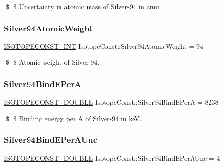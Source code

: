 \$ \$ Uncertainty in atomic mass of Silver-\/94 in amu. \mbox{\label{group___isotope_const-_silver-_ag94_ga02ad799dcf0aab3e61dc5f3f7c143081}} 
\subsubsection{\texorpdfstring{Silver94\+Atomic\+Weight}{Silver94AtomicWeight}}
{\footnotesize\ttfamily \mbox{\hyperlink{group___isotope_const-_macros_ga5f18360b3e99483a35c32d789e62621c}{I\+S\+O\+T\+O\+P\+E\+C\+O\+N\+S\+T\+\_\+\+I\+NT}} Isotope\+Const\+::\+Silver94\+Atomic\+Weight = 94}

\$ \$ Atomic weight of Silver-\/94. \mbox{\label{group___isotope_const-_silver-_ag94_ga5819df665cf02498444ad6043a2589b2}} 
\subsubsection{\texorpdfstring{Silver94\+Bind\+E\+PerA}{Silver94BindEPerA}}
{\footnotesize\ttfamily \mbox{\hyperlink{group___isotope_const-_macros_ga8f45a7272ce02c0b4c65c44636ed719a}{I\+S\+O\+T\+O\+P\+E\+C\+O\+N\+S\+T\+\_\+\+D\+O\+U\+B\+LE}} Isotope\+Const\+::\+Silver94\+Bind\+E\+PerA = 8238}

\$ \$ Binding energy per A of Silver-\/94 in keV. \mbox{\label{group___isotope_const-_silver-_ag94_ga1cb8b24d4958570bdac3f9de02c66201}} 
\subsubsection{\texorpdfstring{Silver94\+Bind\+E\+Per\+A\+Unc}{Silver94BindEPerAUnc}}
{\footnotesize\ttfamily \mbox{\hyperlink{group___isotope_const-_macros_ga8f45a7272ce02c0b4c65c44636ed719a}{I\+S\+O\+T\+O\+P\+E\+C\+O\+N\+S\+T\+\_\+\+D\+O\+U\+B\+LE}} Isotope\+Const\+::\+Silver94\+Bind\+E\+Per\+A\+Unc = 4}

